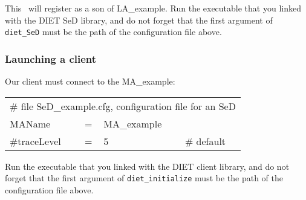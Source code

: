 This \sed\ will register as a son of LA\_example. Run the executable that you
linked with the DIET SeD library, and do not forget that the first argument of
\texttt{diet\_SeD} must be the path of the configuration file above.


\subsubsection{Launching a client}

Our client must connect to the MA\_example:
\tt
\begin{center}
 \footnotesize
 \begin{tabular}{lcll}
  \multicolumn{4}{l}{\# file SeD\_example.cfg, configuration file for an SeD}\\
  MAName       &=&MA\_example        &\\
  \#traceLevel &=&5                 &\# default\\
 \end{tabular}
\end{center}
\rm

Run the executable that you linked with the DIET client library, and do not
forget that the first argument of \texttt{diet\_initialize} must be the path of
the configuration file above.

